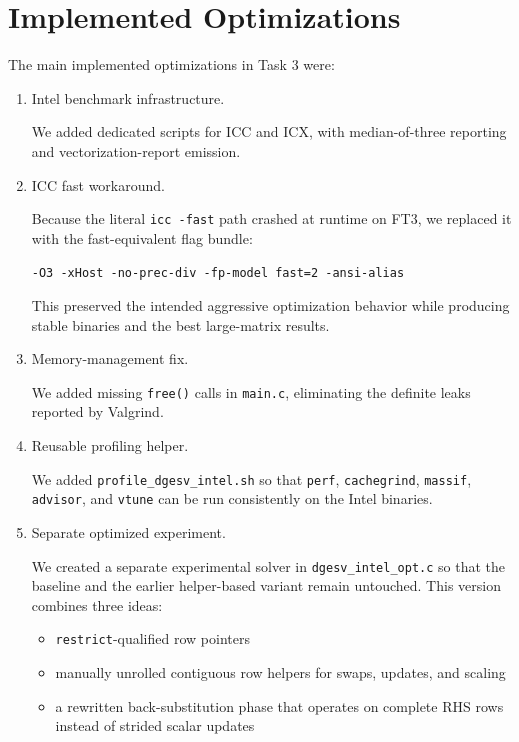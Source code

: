 \documentclass[11pt,a4paper]{article}
\begin{document}
\section{Implemented Optimizations}

The main implemented optimizations in Task 3 were:

\begin{enumerate}
\item Intel benchmark infrastructure.

We added dedicated scripts for ICC and ICX, with median-of-three reporting and
vectorization-report emission.

\item ICC fast workaround.

Because the literal \texttt{icc -fast} path crashed at runtime on FT3, we
replaced it with the fast-equivalent flag bundle:

\begin{center}
\texttt{-O3 -xHost -no-prec-div -fp-model fast=2 -ansi-alias}
\end{center}

This preserved the intended aggressive optimization behavior while producing
stable binaries and the best large-matrix results.

\item Memory-management fix.

We added missing \texttt{free()} calls in \texttt{main.c}, eliminating the
definite leaks reported by Valgrind.

\item Reusable profiling helper.

We added \texttt{profile\_dgesv\_intel.sh} so that \texttt{perf},
\texttt{cachegrind}, \texttt{massif}, \texttt{advisor}, and \texttt{vtune}
can be run consistently on the Intel binaries.

\item Separate optimized experiment.

We created a separate experimental solver in \texttt{dgesv\_intel\_opt.c} so
that the baseline and the earlier helper-based variant remain untouched. This
version combines three ideas:

\begin{itemize}
\item \texttt{restrict}-qualified row pointers
\item manually unrolled contiguous row helpers for swaps, updates, and scaling
\item a rewritten back-substitution phase that operates on complete RHS rows instead of strided scalar updates
\end{itemize}


\end{enumerate}
\end{document}
